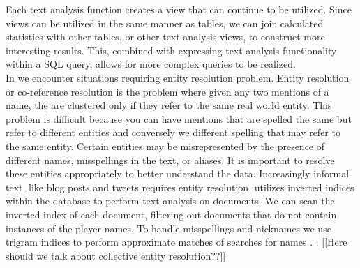 Each text analysis function creates a view that can continue to be utilized.
Since views can be utilized in the same manner as tables, we can join calculated
statistics with other tables, or other text analysis views, to construct more
interesting results. This, combined with expressing text analysis functionality
within a SQL query, allows for more complex queries to be realized. \\


In {\system} we encounter situations requiring entity resolution problem.
Entity resolution or co-reference resolution is the problem where given any two
mentions of a name, the are clustered only if they refer to the same real 
world entity. This problem is difficult because you can have mentions that are
spelled the same but refer to different entities and conversely we different
spelling that may refer to the same entity.
Certain entities may be misrepresented by the presence of different names, 
misspellings in the text, or aliases. It is important to
resolve these entities appropriately to better understand the data. Increasingly
informal text, like blog posts and tweets requires entity resolution. 
{\system} utilizes inverted indices within the database to perform text
analysis on documents. We can scan the inverted index of each 
document, filtering out documents that do not contain instances of the player names.
To handle misspellings and nicknames we use trigram indices to perform 
approximate matches of searches for names \cite{Jain:2009:BQO:1519103.1519108}.
.
[[Here should we talk about collective entity resolution??]]



